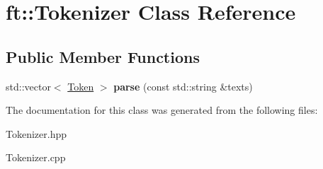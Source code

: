 \hypertarget{classft_1_1Tokenizer}{}\section{ft\+:\+:Tokenizer Class Reference}
\label{classft_1_1Tokenizer}
\subsection*{Public Member Functions}
\begin{DoxyCompactItemize}
\item 
\mbox{\label{classft_1_1Tokenizer_a5a40031b64d1143487b2a53eebd3c7cf}} 
std\+::vector$<$ \hyperlink{classft_1_1Token}{Token} $>$ {\bfseries parse} (const std\+::string \&texts)
\end{DoxyCompactItemize}


The documentation for this class was generated from the following files\+:\begin{DoxyCompactItemize}
\item 
Tokenizer.\+hpp\item 
Tokenizer.\+cpp\end{DoxyCompactItemize}
